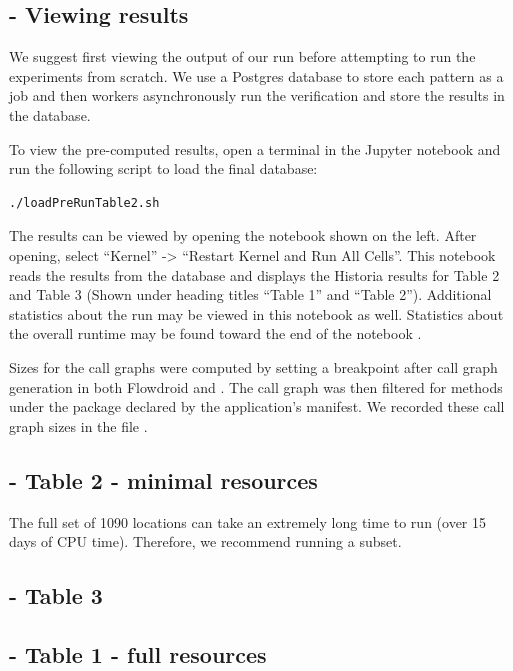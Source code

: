 \documentclass{acmart} %
\begin{document}

\subsection{ - Viewing results}

We suggest first viewing the output of our run before attempting to run the \toolname experiments from scratch.
We use a Postgres database to store each pattern as a job and then workers asynchronously run the verification and store the results in the database.

To view the pre-computed results, open a terminal in the Jupyter notebook and run the following script to load the final database:

\begin{lstlisting}[language=bash]
    ./loadPreRunTable2.sh
\end{lstlisting}

The results can be viewed by opening the notebook  shown on the left.  After opening, select ``Kernel'' -> ``Restart Kernel and Run All Cells''.
This notebook reads the results from the database and displays the Historia results for Table 2 and Table 3 (Shown under heading titles ``Table 1'' and ``Table 2''). Additional statistics about the run may be viewed in this notebook as well. Statistics about the overall runtime may be found toward the end of the notebook .

Sizes for the call graphs were computed by setting a breakpoint after call graph generation in both Flowdroid and \toolname.  The call graph was then filtered for methods under the package declared by the application's manifest.  We recorded these call graph sizes in the file .

\subsection{ - Table 2 - minimal resources}

The full set of 1090 locations can take an extremely long time to run (over 15 days of CPU time).  Therefore, we recommend running a subset.

\subsection{ - Table 3}

\subsection{ - Table 1 - full resources}
\end{document}

